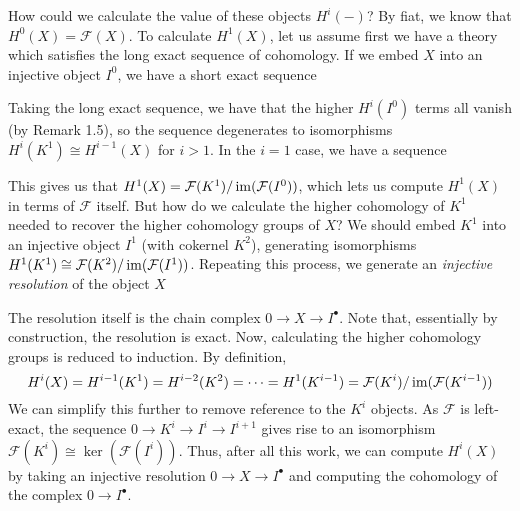 How could we calculate the value of these objects $H^i({-})$? By fiat, we know
that $H^0(X) = \mathcal{F}(X)$. To calculate $H^1(X)$, let us assume first we
have a theory which satisfies the long exact sequence of cohomology. If we embed
$X$ into an injective object $I^0$, we have a short exact sequence
\begin{center}
\end{center}
Taking the long exact sequence, we have that the higher $H^i(I^0)$ terms all
vanish (by Remark 1.5), so the sequence degenerates to isomorphisms $H^i(K^1)
\cong H^{i-1}(X)$ for $i > 1$. In the $i=1$ case, we have a sequence
\begin{center}
\end{center}
This gives us that $H^1(X) = \mathcal{F}(K^1) / \operatorname{im}(\mathcal{F}(I^0))$, which
lets us compute $H^1(X)$ in terms of $\mathcal{F}$ itself. But how do we
calculate the higher cohomology of $K^1$ needed to recover the higher cohomology
groups of $X$? We should embed $K^1$ into an injective object $I^1$ (with
cokernel $K^2$), generating isomorphisms $H^1(K^1) \cong \mathcal{F}(K^2) /
\operatorname{im}(\mathcal{F}(I^1))$. Repeating this process, we generate an \textit{injective
    resolution} of the object $X$
\begin{center}
\end{center}
The resolution itself is the chain complex $0 \to X \to I^\bullet$. Note that,
essentially by construction, the resolution is exact. Now, calculating the
higher cohomology groups is reduced to induction. By definition,
\[
    H^i(X) = H^{i-1}(K^1) = H^{i-2}(K^2) = \cdots = H^1(K^{i-1}) =
    \mathcal{F}(K^i) / \operatorname{im}(\mathcal{F}(K^{i-1}))
\]
We can simplify this further to remove reference to the $K^i$ objects. As
$\mathcal{F}$ is left-exact, the sequence $0 \to K^i \to I^i \to I^{i+1}$ gives
rise to an isomorphism $\mathcal{F}(K^i) \cong \ker(\mathcal{F}(I^i))$. Thus,
after all this work, we can compute $H^i(X)$ by taking an injective resolution
$0 \to X \to I^\bullet$ and computing the cohomology of the complex $0 \to
I^\bullet$.

